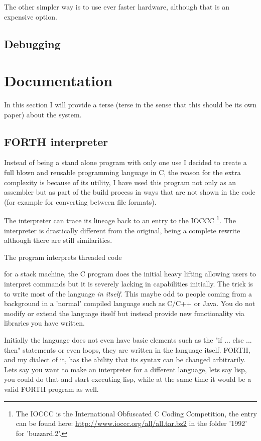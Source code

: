 \documentclass	[a4paper, 10pt]	{article}
\newcommand{\findcite}[1]{
  \par
  \begin{center}
  \framebox[\textwidth]{
    \textcolor{red}{\emph{Find Citation on:} \textsc{#1}}
  }
  \end{center}
  \par
}
\begin{document}
    The other simpler way is to use ever faster hardware, although that is an
    expensive option.

    \subsection{Debugging}

  \section{Documentation}

  In this section I will provide a terse (terse in the sense that this should
  be its own paper) about the system.

    \subsection{FORTH interpreter}

    Instead of being a stand alone program with only one use I decided to create
    a full blown and reusable programming language in C, the reason for the extra
    complexity is because of its utility, I have used this program not only as an
    assembler but as part of the build process in ways that are not shown in the
    code (for example for converting between file formats).

    The interpreter can trace its lineage back to an entry to the IOCCC \footnote{
    The IOCCC is the International Obfuscated C Coding Competition, the entry can
    be found here: \url{http://www.ioccc.org/all/all.tar.bz2} in the folder '1992'
    for 'buzzard.2'.}. The interpreter is drastically different from the original,
    being a complete rewrite although there are still similarities. 

    The program interprets threaded code \findcite{Threaded code} for a stack machine,
    the C program does the initial heavy lifting allowing users to interpret commands
    but it is severely lacking in capabilities initially. The trick is to write most
    of the language \emph{in itself}. This maybe odd to people coming from a background
    in a 'normal' compiled language such as C/C++ or Java. You do not modify or extend
    the language itself but instead provide new functionality via libraries you have
    written.

    Initially the language does not even have basic elements such as the "if ... else ... then"
    statements or even loops, they are written in the language itself. FORTH, and my
    dialect of it, has the ability that its syntax can be changed arbitrarily. Lets say
    you want to make an interpreter for a different language, lets say lisp, you could
    do that and start executing lisp, while at the same time it would be a valid FORTH
    program as well.
\end{document}
